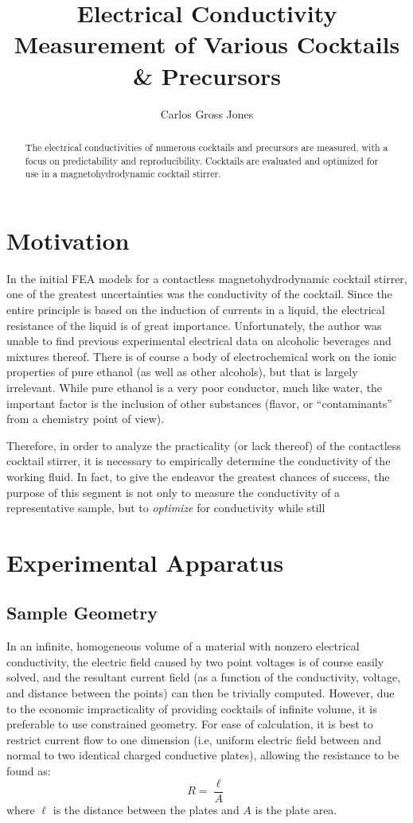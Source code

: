 \documentclass[]{article}
\title{Electrical Conductivity Measurement of Various Cocktails \& Precursors}
\author{Carlos Gross Jones}
\begin{document}
\maketitle

\begin{abstract}
The electrical conductivities of numerous cocktails and precursors are measured, with a focus on predictability and reproducibility. Cocktails are evaluated and optimized for use in a magnetohydrodynamic cocktail stirrer. 
\end{abstract}

\section{Motivation}
\par In the initial FEA models for a contactless magnetohydrodynamic cocktail stirrer, one of the greatest uncertainties was the conductivity of the cocktail. Since the entire principle is based on the induction of currents in a liquid, the electrical resistance of the liquid is of great importance. Unfortunately, the author was unable to find previous experimental electrical data on alcoholic beverages and mixtures thereof. There is of course a body of electrochemical work on the ionic properties of pure ethanol (as well as other alcohols), but that is largely irrelevant. While pure ethanol is a very poor conductor, much like water, the important factor is the inclusion of other substances (flavor, or ``contaminants'' from a chemistry point of view).
\par Therefore, in order to analyze the practicality (or lack thereof) of the contactless cocktail stirrer, it is necessary to empirically determine the conductivity of the working fluid. In fact, to give the endeavor the greatest chances of success, the purpose of this segment is not only to measure the conductivity of a representative sample, but to \textit{optimize} for conductivity while still 
\section{Experimental Apparatus}
\subsection{Sample Geometry}
\par In an infinite, homogeneous volume of a material with nonzero electrical conductivity, the electric field caused by two point voltages is of course easily solved, and the resultant current field (as a function of the conductivity, voltage, and distance between the points) can then be trivially computed. However, due to the economic impracticality of providing cocktails of infinite volume, it is preferable to use constrained geometry. For ease of calculation, it is best to restrict current flow to one dimension (i.e, uniform electric field between and normal to two identical charged conductive plates), allowing the resistance to be found as:
\begin{equation}
R=\frac{\ell}{A}
\end{equation}
where $\ell$ is the distance between the plates and $A$ is the plate area.
\end{document}
